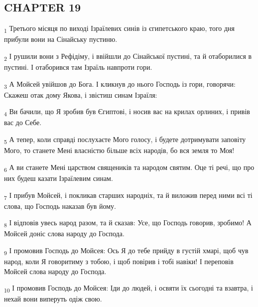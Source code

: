 \subsection{CHAPTER 19}
\begin{tcolorbox}
\textsubscript{1} Третього місяця по виході Ізраїлевих синів із єгипетського краю, того дня прибули вони на Сінайську пустиню.
\end{tcolorbox}
\begin{tcolorbox}
\textsubscript{2} І рушили вони з Рефідіму, і ввійшли до Сінайської пустині, та й отаборилися в пустині. І отаборився там Ізраїль навпроти гори.
\end{tcolorbox}
\begin{tcolorbox}
\textsubscript{3} А Мойсей увійшов до Бога. І кликнув до нього Господь із гори, говорячи: Скажеш отак дому Якова, і звістиш синам Ізраїля:
\end{tcolorbox}
\begin{tcolorbox}
\textsubscript{4} Ви бачили, що Я зробив був Єгиптові, і носив вас на крилах орлиних, і привів вас до Себе.
\end{tcolorbox}
\begin{tcolorbox}
\textsubscript{5} А тепер, коли справді послухаєте Мого голосу, і будете дотримувати заповіту Мого, то станете Мені власністю більше всіх народів, бо вся земля то Моя!
\end{tcolorbox}
\begin{tcolorbox}
\textsubscript{6} А ви станете Мені царством священиків та народом святим. Оце ті речі, що про них будеш казати Ізраїлевим синам.
\end{tcolorbox}
\begin{tcolorbox}
\textsubscript{7} І прибув Мойсей, і покликав старших народніх, та й виложив перед ними всі ті слова, що Господь наказав був йому.
\end{tcolorbox}
\begin{tcolorbox}
\textsubscript{8} І відповів увесь народ разом, та й сказав: Усе, що Господь говорив, зробимо! А Мойсей доніс слова народу до Господа.
\end{tcolorbox}
\begin{tcolorbox}
\textsubscript{9} І промовив Господь до Мойсея: Ось Я до тебе прийду в густій хмарі, щоб чув народ, коли Я говоритиму з тобою, і щоб повірив і тобі навіки! І переповів Мойсей слова народу до Господа.
\end{tcolorbox}
\begin{tcolorbox}
\textsubscript{10} І промовив Господь до Мойсея: Іди до людей, і освяти їх сьогодні та взавтра, і нехай вони виперуть одіж свою.
\end{tcolorbox}
